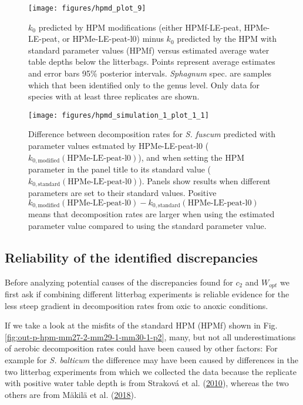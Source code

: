 \documentclass[
  12pt,
]{article}
\begin{document}
\begin{figure}[H]

{\centering \texttt{[image: figures/hpmd\_plot\_9]} 

}

\caption{\(k_0\) predicted by HPM modifications (either HPMf-LE-peat, HPMe-LE-peat, or HPMe-LE-peat-l0) minus \(k_0\) predicted by the HPM with standard parameter values (HPMf) versus estimated average water table depths below the litterbags. Points represent average estimates and error bars 95\% posterior intervals. \emph{Sphagnum} spec. are samples which that been identified only to the genus level. Only data for species with at least three replicates are shown.}\label{fig:out-p-hpmd-plot-9}
\end{figure}



\begin{figure}[H]

{\centering \texttt{[image: figures/hpmd\_simulation\_1\_plot\_1\_1]} 

}

\caption{Difference between decomposition rates for \emph{S. fuscum} predicted with parameter values estmated by HPMe-LE-peat-l0 (\(k_{0,\text{modified}}(\text{HPMe-LE-peat-l0})\)), and when setting the HPM parameter in the panel title to its standard value (\(k_{0,\text{standard}}(\text{HPMe-LE-peat-l0})\)). Panels show results when different parameters are set to their standard values. Positive \(k_{0,\text{modified}}(\text{HPMe-LE-peat-l0}) - k_{0,\text{standard}}(\text{HPMe-LE-peat-l0})\) means that decomposition rates are larger when using the estimated parameter value compared to using the standard parameter value.}\label{fig:out-sdm-parameters-standard-vs-estimated-p1}
\end{figure}

\hypertarget{out-discussion-3}{%
\subsection{Reliability of the identified discrepancies}\label{out-discussion-3}}

Before analyzing potential causes of the discrepancies found for \(c_2\) and \(W_{opt}\) we first ask if combining different litterbag experiments is reliable evidence for the less steep gradient in decomposition rates from oxic to anoxic conditions.

If we take a look at the misfits of the standard HPM (HPMf) shown in Fig. \ref{fig:out-p-hpm-mm27-2-mm29-1-mm30-1-p2}, many, but not all underestimations of aerobic decomposition rates could have been caused by other factors: For example for \emph{S. balticum} the difference may have been caused by differences in the two litterbag experiments from which we collected the data because the replicate with positive water table depth is from Straková et al. (\protect\hyperlink{ref-Strakova.2010}{2010}), whereas the two others are from Mäkilä et al. (\protect\hyperlink{ref-Makila.2018}{2018}).
\end{document}
